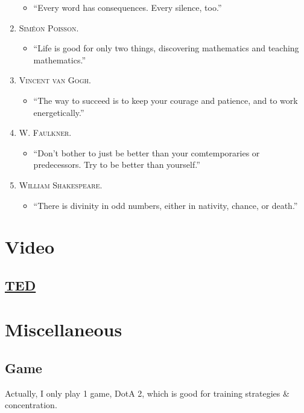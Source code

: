 \documentclass[oneside]{book}
\numberwithin{equation}{section}
\begin{document}
\begin{enumerate}
\begin{itemize}
		\item ``Every word has consequences. Every silence, too.''
	\end{itemize}
	\item \textsc{Sim\'eon Poisson.}
	\begin{itemize}
		\item ``Life is good for only two things, discovering mathematics and teaching mathematics.''
	\end{itemize}
	\item \textsc{Vincent van Gogh.}
	\begin{itemize}
		\item ``The way to succeed is to keep your courage and patience, and to work energetically.''
	\end{itemize}
	\item \textsc{W. Faulkner.}
	\begin{itemize}
		\item ``Don't bother to just be better than your comtemporaries or predecessors. Try to be better than yourself.''
	\end{itemize}
	\item \textsc{William Shakespeare.}
	\begin{itemize}
		\item ``There is divinity in odd numbers, either in nativity, chance, or death.''
	\end{itemize}
\end{enumerate}


\chapter{Video}

\section{\href{https://www.ted.com/}{TED}}


\chapter{Miscellaneous}

\section{Game}
Actually, I only play 1 game, DotA 2, which is good for training strategies \& concentration.
\end{document}
